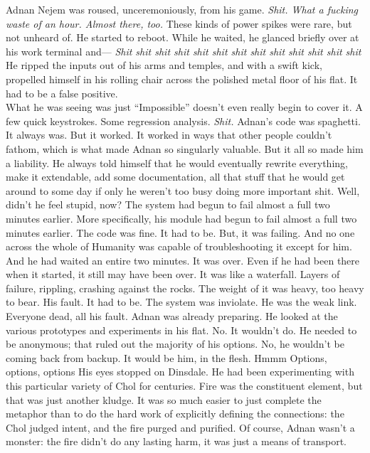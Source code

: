 Adnan Nejem was roused, unceremoniously, from his game.
\SmallVSpace
\emph{Shit. What a fucking waste of an hour. Almost there, too.}
\SmallVSpace
These kinds of power spikes were rare, but not unheard of. He started to reboot. While he waited, he glanced briefly over at his work terminal and\mbox{---}
\SmallVSpace
\emph{Shit shit shit shit shit shit shit shit shit shit shit shit shit}
\SmallVSpace
He ripped the inputs out of his arms and temples, and with a swift kick, propelled himself in his rolling chair across the polished metal floor of his flat. It had to be a false positive.\\What he was seeing was just{\el} “Impossible” doesn’t even really begin to cover it.
\SmallVSpace
A few quick keystrokes. Some regression analysis.
\SmallVSpace
\emph{Shit.}
\SmallVSpace
Adnan’s code was spaghetti. It always was. But it worked. It worked in ways that other people couldn’t fathom, which is what made Adnan so singularly valuable. But it all so made him a liability. He always told himself that he would eventually rewrite everything, make it extendable, add some documentation, all that stuff that he would get around to some day if only he weren’t too busy doing more important shit.
\SmallVSpace
Well, didn’t he feel stupid, now?
\SmallVSpace
The system had begun to fail almost a full two minutes earlier. More specifically, his module had begun to fail almost a full two minutes earlier. The code was fine. It had to be. But, it was failing. And no one across the whole of Humanity was capable of troubleshooting it except for him. And he had waited an entire two minutes. It was over. Even if he had been there when it started, it still may have been over.
\SmallVSpace
It was like a waterfall. Layers of failure, rippling, crashing against the rocks. The weight of it was heavy, too heavy to bear. His fault. It had to be. The system was inviolate. He was the weak link. Everyone dead, all his fault.
\SmallVSpace
Adnan was already preparing. He looked at the various prototypes and experiments in his flat. No. It wouldn’t do. He needed to be anonymous; that ruled out the majority of his options. No, he wouldn’t be coming back from backup. It would be him, in the flesh.
\SomeVSpace
Hmmm{\el} Options, options, options{\el}
\SomeVSpace
His eyes stopped on Dinsdale. He had been experimenting with this particular variety of Chol for centuries. Fire was the constituent element, but that was just another kludge. It was so much easier to just complete the metaphor than to do the hard work of explicitly defining the connections: the Chol judged intent, and the fire purged and purified. Of course, Adnan wasn’t a monster: the fire didn’t do any lasting harm, it was just a means of transport.
